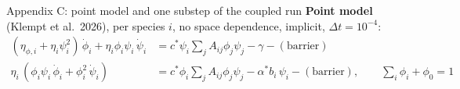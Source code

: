 \documentclass[aspectratio=169,11pt]{beamer}
\begin{document}
\begin{frame}{Appendix C: point model and one substep of the coupled run}
\footnotesize
\textbf{Point model} (Klempt et al.\ 2026), per species $i$, no space dependence, implicit, $\Delta t=10^{-4}$:
\vspace{-4pt}
\[
\begin{aligned}
(\eta_{\phi,i}+\eta_i\psi_i^2)\,\dot\phi_i+\eta_i\phi_i\psi_i\,\dot\psi_i
&= c^*\psi_i\textstyle\sum_j A_{ij}\phi_j\psi_j-\gamma-(\text{barrier})\\[-2pt]
\eta_i\,(\phi_i\psi_i\,\dot\phi_i+\phi_i^2\,\dot\psi_i)
&= c^*\phi_i\textstyle\sum_j A_{ij}\phi_j\psi_j-\alpha^* b_i\,\psi_i-(\text{barrier}),
\qquad \textstyle\sum_i\phi_i+\phi_0=1
\end{aligned}
\]
\vspace{-6pt}


\end{frame}
\end{document}
